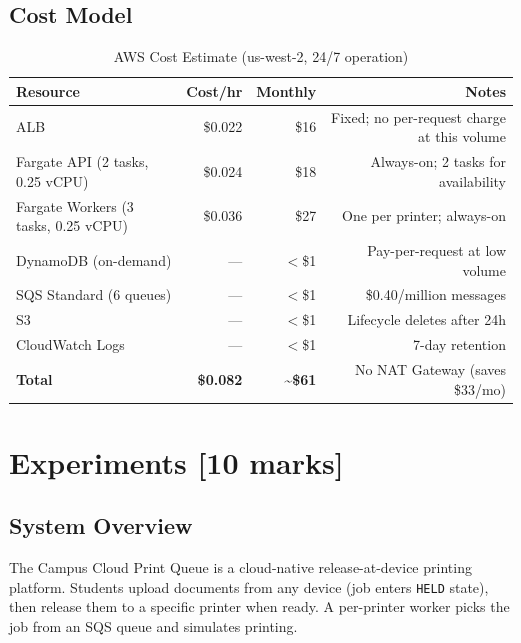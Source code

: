 \documentclass[11pt,letterpaper]{article}
\begin{document}
\subsection{Cost Model}

\begin{table}[H]
\centering
\caption{AWS Cost Estimate (us-west-2, 24/7 operation)}
\begin{tabular}{@{}lrrr@{}}
\toprule
\textbf{Resource} & \textbf{Cost/hr} & \textbf{Monthly} & \textbf{Notes} \\
\midrule
ALB                                & \$0.022 & \$16   & Fixed; no per-request charge at this volume \\
Fargate API (2 tasks, 0.25 vCPU)  & \$0.024 & \$18   & Always-on; 2 tasks for availability \\
Fargate Workers (3 tasks, 0.25 vCPU) & \$0.036 & \$27 & One per printer; always-on \\
DynamoDB (on-demand)              & ---     & $<$\$1 & Pay-per-request at low volume \\
SQS Standard (6 queues)          & ---     & $<$\$1 & \$0.40/million messages \\
S3                                & ---     & $<$\$1 & Lifecycle deletes after 24h \\
CloudWatch Logs                   & ---     & $<$\$1 & 7-day retention \\
\midrule
\textbf{Total}                    & \textbf{\$0.082} & \textbf{\textasciitilde\$61} & No NAT Gateway (saves \$33/mo) \\
\bottomrule
\end{tabular}
\end{table}


\section{Experiments [10 marks]}
\label{sec:experiments}

\subsection{System Overview}

The Campus Cloud Print Queue is a cloud-native release-at-device printing platform. Students upload documents from any device (job enters \texttt{HELD} state), then release them to a specific printer when ready. A per-printer worker picks the job from an SQS queue and simulates printing.
\end{document}
